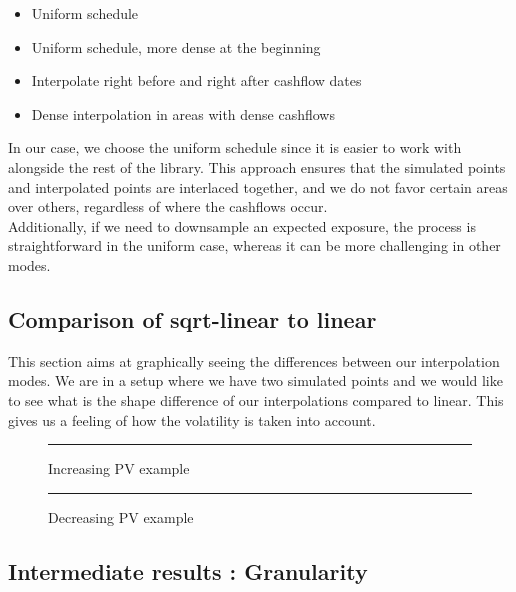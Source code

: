 \documentclass{article}
\begin{document}
\begin{itemize}
    \item Uniform schedule
    \item Uniform schedule, more dense at the beginning
    \item Interpolate right before and right after cashflow dates
    \item Dense interpolation in areas with dense cashflows
\end{itemize}

In our case, we choose the uniform schedule since it is easier to work with alongside the rest of the library. This approach ensures that the simulated points and interpolated points are interlaced together, and we do not favor certain areas over others, regardless of where the cashflows occur.\\
\indent Additionally, if we need to downsample an expected exposure, the process is straightforward in the uniform case, whereas it can be more challenging in other modes.


\subsection{Comparison of sqrt-linear to linear}

This section aims at graphically seeing the differences between our interpolation modes. We are in a setup where we have two simulated points and we would like to see what is the shape difference of our interpolations compared to linear. This gives us a feeling of how the volatility is taken into account.

\begin{figure}[H]
    \centering
    \begin{minipage}{0.48\textwidth}
        \centering
        \rule{1.0\textwidth}{0.28\textheight} %
        \caption{Increasing PV example}
        \label{fig:first}
    \end{minipage}
    \hfill
    \begin{minipage}{0.48\textwidth}
        \centering
        \rule{1.0\textwidth}{0.28\textheight} %
        \caption{Decreasing PV example}
        \label{fig:second}
    \end{minipage}
\end{figure}


\subsection{Intermediate results : Granularity}
\end{document}
